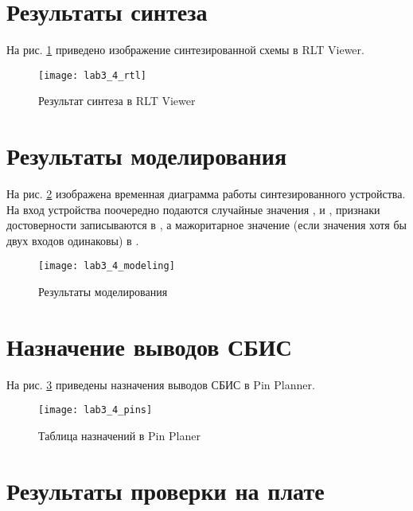 

\section{Результаты синтеза}

На рис. \ref{fig:lab3_4_rtl} приведено изображение синтезированной схемы в RLT Viewer.

\begin{figure}[H]
\begin{center}
	\texttt{[image: lab3\_4\_rtl]}
	\caption{Результат синтеза в RLT Viewer}
	\label{fig:lab3_4_rtl}
\end{center}
\end{figure}

\section{Результаты моделирования}
\label{sec:lab3_4_modeling}

На рис. \ref{fig:lab3_4_modeling} изображена временная диаграмма работы синтезированного устройства. На вход устройства поочередно подаются случайные значения ,  и , признаки достоверности записываются в , а мажоритарное значение (если значения хотя бы двух входов одинаковы) в .

\begin{figure}[H]
\begin{center}
	\texttt{[image: lab3\_4\_modeling]}
	\caption{Результаты моделирования}
	\label{fig:lab3_4_modeling}
\end{center}
\end{figure}

\section{Назначение выводов СБИС}

На рис. \ref{fig:lab3_4_pins} приведены назначения выводов СБИС в Pin Planner.

\begin{figure}[H]
\begin{center}
	\texttt{[image: lab3\_4\_pins]}
	\caption{Таблица назначений в Pin Planer}
	\label{fig:lab3_4_pins}
\end{center}
\end{figure}

\section{Результаты проверки на плате}

